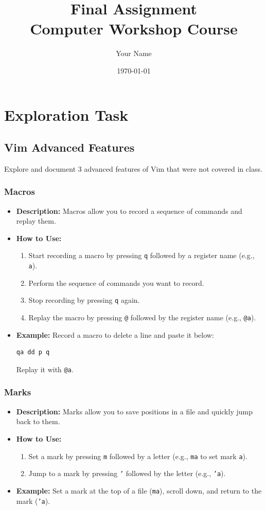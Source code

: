 \documentclass{article}
\title{Final Assignment \\ Computer Workshop Course}
\author{Your Name}
\date{\today}
\begin{document}
\maketitle
\tableofcontents
\newpage

\section{Exploration Task}

\subsection{Vim Advanced Features}
Explore and document 3 advanced features of Vim that were not covered in class.

\subsubsection{Macros}
\begin{itemize}
    \item \textbf{Description:} Macros allow you to record a sequence of commands and replay them.
    \item \textbf{How to Use:}
    \begin{enumerate}
        \item Start recording a macro by pressing \texttt{q} followed by a register name (e.g., \texttt{a}).
        \item Perform the sequence of commands you want to record.
        \item Stop recording by pressing \texttt{q} again.
        \item Replay the macro by pressing \texttt{@} followed by the register name (e.g., \texttt{@a}).
    \end{enumerate}
    \item \textbf{Example:} Record a macro to delete a line and paste it below:
    \begin{lstlisting}[language=bash]
    qa dd p q
    \end{lstlisting}
    Replay it with \texttt{@a}.
\end{itemize}

\subsubsection{Marks}
\begin{itemize}
    \item \textbf{Description:} Marks allow you to save positions in a file and quickly jump back to them.
    \item \textbf{How to Use:}
    \begin{enumerate}
        \item Set a mark by pressing \texttt{m} followed by a letter (e.g., \texttt{ma} to set mark \texttt{a}).
        \item Jump to a mark by pressing \texttt{'} followed by the letter (e.g., \texttt{'a}).
    \end{enumerate}
    \item \textbf{Example:} Set a mark at the top of a file (\texttt{ma}), scroll down, and return to the mark (\texttt{'a}).
\end{itemize}
\end{document}
